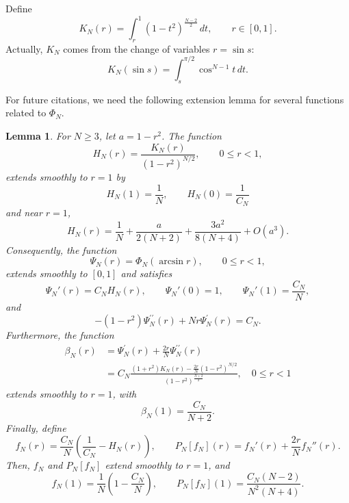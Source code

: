 \documentclass[11pt,letterpaper]{amsart}
\newtheorem{lemma}[theorem]{Lemma}
\theoremstyle{definition}
\theoremstyle{remark}
\numberwithin{equation}{section}
\begin{document}
Define
\begin{equation}\label{eq:K-N}
 K_N(r)=\int_r^1(1-t^2)^{\frac{N-2}{2}}\,dt, \qquad r \in [0,1].
\end{equation}
Actually, \(K_N\) comes from the change of variables \(r=\sin s\):
\[
  K_N(\sin s)
  =
  \int_s^{\pi/2}\cos^{N-1}t\,dt.
\]


For future citations, we need the following extension lemma for several functions related to $\Phi_N$.
\begin{lemma}\label{lem:endpoint-regularity}
For $N\ge3$,  let $a=1-r^2$. The function
\begin{equation}\label{eq:def of H-N}
H_N(r)=\frac{K_N(r)}{(1-r^2)^{N/2}},\qquad 0\le r<1,
\end{equation}
extends smoothly to $r=1$ by
\begin{equation}\label{eq:HN-endpoint-values}
 H_N(1)=\frac1N, \qquad H_N(0)=\frac1{C_N}
\end{equation}
and near $r=1$,
\begin{equation}\label{eq:HN-expansion}
 H_N(r)=\frac1N+\frac{a}{2(N+2)}+\frac{3a^2}{8(N+4)}+O(a^3).
\end{equation}
Consequently, the function
\begin{equation}\label{eq:Psi def}
\Psi_N(r)=\Phi_N(\arcsin r),\qquad 0\le r<1,
\end{equation}
extends smoothly to $[0,1]$ and satisfies
\begin{equation}\label{eq:Psi-derivative}
 \Psi_N'(r)=C_NH_N(r),\qquad \Psi_N'(0)=1,
 \qquad \Psi_N'(1)=\frac{C_N}{N},
\end{equation}
and
\begin{equation}\label{eq:Psi-derivative 2}
-\left(1-r^2\right) \Psi_N^{\prime \prime}(r)+N r \Psi_N^{\prime}(r)=C_N .
\end{equation}
Furthermore, the function
\begin{equation}\label{eq:beta-N}
\begin{aligned}
\beta_N(r)&=\Psi_N^{\prime}(r)+\frac{2 r}{N} \Psi_N^{\prime \prime}(r)\\
 &=C_N\frac{(1+r^2)K_N(r)-\frac{2r}{N}(1-r^2)^{N/2}}
 {(1-r^2)^{\frac{N+2}{2}}}, \quad 0\le r<1
\end{aligned}
\end{equation}
extends smoothly to $r=1$, with
\begin{equation}\label{eq:beta-endpoint}
 \beta_N(1)=\frac{C_N}{N+2}.
\end{equation}
Finally, define
\[
 f_N(r)=\frac{C_N}{N}\left(\frac1{C_N}-H_N(r)\right),\qquad
 P_N[f_N](r)=f_N'(r)+\frac{2r}{N}f_N''(r).
\]
Then, $f_N$ and $P_N[f_N]$ extend smoothly to $r=1$, and
\begin{equation}\label{eq:PN-endpoint}
 f_N(1)=\frac1N\left(1-\frac{C_N}{N}\right),\qquad
 P_N[f_N](1)=\frac{C_N(N-2)}{N^2(N+4)}.
\end{equation}
\end{lemma}
\end{document}
